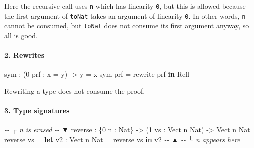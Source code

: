 \documentclass[
]{article}
\newenvironment{Shaded}{}{}
\newcommand{\CommentTok}[1]{\textcolor[rgb]{0.38,0.63,0.69}{\textit{#1}}}
\newcommand{\DataTypeTok}[1]{\textcolor[rgb]{0.56,0.13,0.00}{#1}}
\newcommand{\DecValTok}[1]{\textcolor[rgb]{0.25,0.63,0.44}{#1}}
\newcommand{\FunctionTok}[1]{\textcolor[rgb]{0.02,0.16,0.49}{#1}}
\newcommand{\KeywordTok}[1]{\textcolor[rgb]{0.00,0.44,0.13}{\textbf{#1}}}
\newcommand{\NormalTok}[1]{#1}
\newcommand{\OperatorTok}[1]{\textcolor[rgb]{0.40,0.40,0.40}{#1}}
\newcommand{\OtherTok}[1]{\textcolor[rgb]{0.00,0.44,0.13}{#1}}
\begin{document}
Here the recursive call uses \texttt{n} which has linearity \texttt{0},
but this is allowed because the first argument of \texttt{toNat} takes
an argument of linearity \texttt{0}. In other words, \texttt{n} cannot
be consumed, but \texttt{toNat} does not consume its first argument
anyway, so all is good.

\hypertarget{rewrites}{%
\paragraph{2. Rewrites}\label{rewrites}}

\begin{Shaded}
\begin{Highlighting}[]
\NormalTok{sym }\OperatorTok{:}\NormalTok{ (}\DecValTok{0}\NormalTok{ prf }\OperatorTok{:}\NormalTok{ x }\OtherTok{=}\NormalTok{ y) }\OtherTok{{-}\textgreater{}}\NormalTok{ y }\OtherTok{=}\NormalTok{ x}
\NormalTok{sym prf }\OtherTok{=}\NormalTok{ rewrite prf }\KeywordTok{in} \DataTypeTok{Refl}
\end{Highlighting}
\end{Shaded}

Rewriting a type does not consume the proof.

\hypertarget{type-signatures}{%
\paragraph{3. Type signatures}\label{type-signatures}}

\begin{Shaded}
\begin{Highlighting}[]
\CommentTok{{-}{-}          ┌ \textasciigrave{}n\textasciigrave{} is erased}
\CommentTok{{-}{-}          ▼}
\NormalTok{reverse\textquotesingle{} }\OperatorTok{:}\NormalTok{ \{}\DecValTok{0}\NormalTok{ n }\OperatorTok{:} \DataTypeTok{Nat}\NormalTok{\} }\OtherTok{{-}\textgreater{}}\NormalTok{ (}\DecValTok{1}\NormalTok{ vs }\OperatorTok{:} \DataTypeTok{Vect}\NormalTok{ n }\DataTypeTok{Nat}\NormalTok{) }\OtherTok{{-}\textgreater{}} \DataTypeTok{Vect}\NormalTok{ n }\DataTypeTok{Nat}
\NormalTok{reverse\textquotesingle{} vs }\OtherTok{=} \KeywordTok{let}\NormalTok{ v2 }\OperatorTok{:} \DataTypeTok{Vect}\NormalTok{ n }\DataTypeTok{Nat} \OtherTok{=} \FunctionTok{reverse}\NormalTok{ vs }\KeywordTok{in}\NormalTok{ v2}
\CommentTok{{-}{-}                          ▲}
\CommentTok{{-}{-}                          └ \textasciigrave{}n\textasciigrave{} appears here}
\end{Highlighting}
\end{Shaded}
\end{document}
